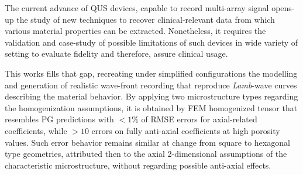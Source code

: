 \begin{conclusion}




The current advance of QUS devices, capable to record multi-array signal opens-up the study of new techniques to recover clinical-relevant data from which various material properties can be extracted. Nonetheless, it requires the validation and case-study of possible limitations of such devices in wide variety of setting to evaluate fidelity and therefore, assure clinical usage.

This works fills that gap, recreating under simplified configurations the modelling and generation of realistic wave-front recording that reproduce \textit{Lamb}-wave curves describing the material behavior.
By applying two microstructure types regarding the homogenization assumptions, it is obtained by FEM homogenized tensor that resembles PG predictions with $< 1 \%$ of RMSE errors for axial-related coefficients, while $> 10$ errors on fully anti-axial coefficients at high porosity values. Such error behavior remains similar at change from square to hexagonal type geometries, attributed then to the axial 2-dimensional assumptions of the characteristic microstructure, without regarding possible anti-axial effects.


\end{conclusion}
